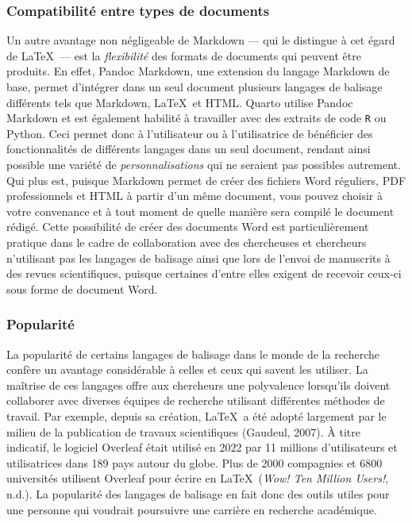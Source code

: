 \documentclass[
  letterpaper,
  DIV=11,
  numbers=noendperiod]{scrreprt}
\begin{document}
\subsubsection{Compatibilité entre types de
documents}\label{compatibilituxe9-entre-types-de-documents}

Un autre avantage non négligeable de Markdown --- qui le distingue à cet
égard de \LaTeX~--- est la \emph{flexibilité} des formats de documents
qui peuvent être produits. En effet, Pandoc Markdown, une extension du
langage Markdown de base, permet d'intégrer dans un seul document
plusieurs langages de balisage différents tels que Markdown, \LaTeX~et
HTML. Quarto utilise Pandoc Markdown et est également habilité à
travailler avec des extraits de code \texttt{R} ou Python. Ceci permet
donc à l'utilisateur ou à l'utilisatrice de bénéficier des
fonctionnalités de différents langages dans un seul document, rendant
ainsi possible une variété de \emph{personnalisations} qui ne seraient
pas possibles autrement. Qui plus est, puisque Markdown permet de créer
des fichiers Word réguliers, PDF professionnels et HTML à partir d'un
même document, vous pouvez choisir à votre convenance et à tout moment
de quelle manière sera compilé le document rédigé. Cette possibilité de
créer des documents Word est particulièrement pratique dans le cadre de
collaboration avec des chercheuses et chercheurs n'utilisant pas les
langages de balisage ainsi que lors de l'envoi de manuscrits à des
revues scientifiques, puisque certaines d'entre elles exigent de
recevoir ceux-ci sous forme de document Word.

\subsubsection{Popularité}\label{popularituxe9}

La popularité de certains langages de balisage dans le monde de la
recherche confère un avantage considérable à celles et ceux qui savent
les utiliser. La maîtrise de ces langages offre aux chercheurs une
polyvalence lorsqu'ils doivent collaborer avec diverses équipes de
recherche utilisant différentes méthodes de travail. Par exemple, depuis
sa création, \LaTeX~a été adopté largement par le milieu de la
publication de travaux scientifiques (Gaudeul, 2007). À titre indicatif,
le logiciel Overleaf était utilisé en 2022 par 11 millions
d'utilisateurs et utilisatrices dans 189 pays autour du globe. Plus de
2000 compagnies et 6800 universités utilisent Overleaf pour écrire en
\LaTeX~(\emph{Wow! {Ten} Million Users!}, n.d.). La popularité des
langages de balisage en fait donc des outils utiles pour une personne
qui voudrait poursuivre une carrière en recherche académique.
\end{document}
